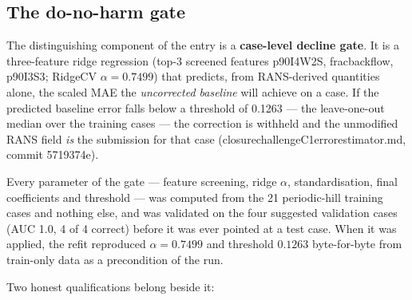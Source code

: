 \documentclass[11pt,a4paper]{article}
\newcommand{\breakus}{\textunderscore\allowbreak}
\newcommand{\code}[1]{{\small\ttfamily\let\_\breakus #1}}
\newcommand{\artifact}[1]{{\footnotesize\ttfamily\let\_\breakus #1}}
\begin{document}
\subsection{The do-no-harm gate}
\label{sec:gate}

The distinguishing component of the entry is a \textbf{case-level decline gate}. It is a
three-feature ridge regression (top-3 screened features \code{p90\_I4\_W2S},
\code{frac\_backflow}, \code{p90\_I3\_S3}; RidgeCV $\alpha = 0.7499$) that predicts, from
RANS-derived quantities alone, the scaled MAE the \emph{uncorrected baseline} will achieve
on a case. If the predicted baseline error falls below a threshold of 0.1263 --- the
leave-one-out median over the training cases --- the correction is withheld and the
unmodified RANS field \emph{is} the submission for that case
(\artifact{closure\_challenge\_C1\_error\_estimator.md}, commit
\code{5719374e}).

Every parameter of the gate --- feature screening, ridge $\alpha$, standardisation, final
coefficients and threshold --- was computed from the 21 periodic-hill training cases and
nothing else, and was validated on the four suggested validation cases (AUC 1.0, 4 of 4
correct) before it was ever pointed at a test case. When it was applied, the refit
reproduced $\alpha = 0.7499$ and threshold $0.1263$ byte-for-byte from train-only data as a
precondition of the run.

Two honest qualifications belong beside it:
\end{document}
